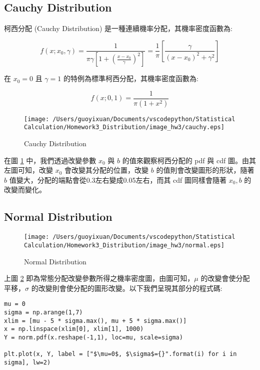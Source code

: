 \subsection{Cauchy Distribution}

柯西分配 (Cauchy Distribution) 是一種連續機率分配，其機率密度函數為:

\begin{equation}
f(x;x_0,\gamma)=\frac{1}{\pi \gamma [1+(\frac{x-x_0}{\gamma})^2]}=\frac{1}{\pi}[\frac{\gamma}{(x-x_0)^2+\gamma^2}]
\end{equation}

在 $x_0=0$ 且 $\gamma=1$ 的特例為標準柯西分配，其機率密度函數為:

\begin{equation}
f(x;0,1)=\frac{1}{\pi (1+x^2)}
\end{equation}

\begin{figure}[H]
    \centering
        \texttt{[image: /Users/guoyixuan/Documents/vscodepython/Statistical Calculation/Homework3\_Distribution/image\_hw3/cauchy.eps]}
    \caption{Cauchy Distribution}
    \label{cauchy}
\end{figure}

在圖 \ref{cauchy} 中，我們透過改變參數 $x_0$ 與 $b$ 的值來觀察柯西分配的 pdf 與 cdf 圖。由其左圖可知，改變 $x_0$ 會改變其分配的位置，改變 $b$ 的值則會改變圖形的形狀，隨著 $b$ 值變大，分配的端點會從0.3左右變成0.05左右，而其 cdf 圖同樣會隨著 $x_0, b$ 的改變而變化。

\subsection{Normal Distribution}

\begin{figure}[H]
    \centering
        \texttt{[image: /Users/guoyixuan/Documents/vscodepython/Statistical Calculation/Homework3\_Distribution/image\_hw3/normal.eps]}
    \caption{Normal Distribution}
    \label{normal}
\end{figure}

上圖 \ref{normal} 即為常態分配改變參數所得之機率密度圖，由圖可知，$\mu$ 的改變會使分配平移，$\sigma$ 的改變則會使分配的圖形改變。以下我們呈現其部分的程式碼:

\bigskip
\begin{lstlisting}
mu = 0
sigma = np.arange(1,7)
xlim = [mu - 5 * sigma.max(), mu + 5 * sigma.max()]
x = np.linspace(xlim[0], xlim[1], 1000)
Y = norm.pdf(x.reshape(-1,1), loc=mu, scale=sigma)

plt.plot(x, Y, label = ["$\mu=0$, $\sigma$={}".format(i) for i in sigma], lw=2)
\end{lstlisting}

